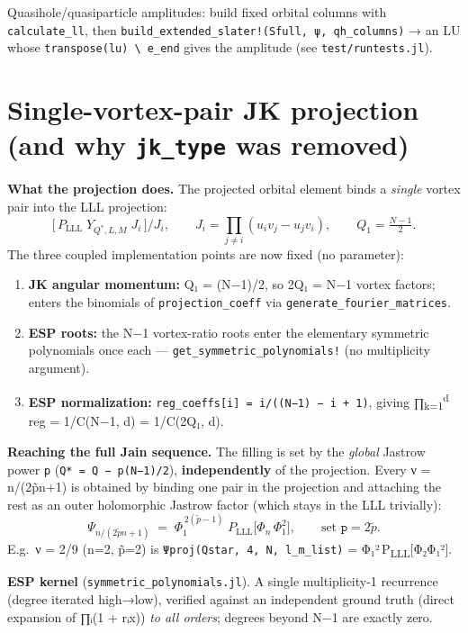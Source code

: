 \documentclass[11pt]{article}
\newcommand{\code}[1]{\texttt{#1}}
\begin{document}
Quasihole/quasiparticle amplitudes: build fixed orbital columns with \code{calculate\_ll}, then
\code{build\_extended\_slater!(Sfull, ψ, qh\_columns)} → an LU whose \code{transpose(lu) \textbackslash\ e\_end}
gives the amplitude (see \code{test/runtests.jl}).

\section{Single-vortex-pair JK projection (and why \code{jk\_type} was removed)}\label{sec:jktype}

\textbf{What the projection does.} The projected orbital element binds a \emph{single} vortex
pair into the LLL projection:
\[
\bigl[\,P_{\mathrm{LLL}}\; Y_{Q^*,L,M}\; J_i\,\bigr]\big/ J_i,
\qquad J_i = \prod_{j\neq i}(u_i v_j - u_j v_i),
\qquad Q_1 = \tfrac{N-1}{2}.
\]
The three coupled implementation points are now fixed (no parameter):
\begin{enumerate}
\item \textbf{JK angular momentum:} Q₁ = (N−1)/2, so 2Q₁ = N−1 vortex factors; enters the
  binomials of \code{projection\_coeff} via \code{generate\_fourier\_matrices}.
\item \textbf{ESP roots:} the N−1 vortex-ratio roots enter the elementary symmetric polynomials
  once each --- \code{get\_symmetric\_polynomials!} (no multiplicity argument).
\item \textbf{ESP normalization:} \code{reg\_coeffs[i] = i/((N−1) − i + 1)}, giving
  ∏\textsubscript{k=1}\textsuperscript{d} reg = 1/C(N−1, d) = 1/C(2Q₁, d).
\end{enumerate}

\textbf{Reaching the full Jain sequence.} The filling is set by the \emph{global} Jastrow power
\code{p} (\code{Q* = Q − p(N−1)/2}), \textbf{independently} of the projection. Every
ν = n/(2p̃n+1) is obtained by binding one pair in the projection and attaching the rest as an
outer holomorphic Jastrow factor (which stays in the LLL trivially):
\[
\Psi_{n/(2\tilde p n+1)} \;=\; \Phi_1^{\,2(\tilde p-1)}\; P_{\mathrm{LLL}}\!\bigl[\Phi_n\,\Phi_1^2\bigr],
\qquad\text{set } \code{p} = 2\tilde p .
\]
E.g.\ ν = 2/9 (n=2, p̃=2) is \code{Ψproj(Qstar, 4, N, l\_m\_list)} = Φ₁²\,P\textsubscript{LLL}[Φ₂Φ₁²].

\textbf{ESP kernel} (\code{symmetric\_polynomials.jl}). A single multiplicity-1 recurrence
(degree iterated high→low), verified against an independent ground truth (direct expansion of
∏ᵢ(1 + rᵢx)) \emph{to all orders}; degrees beyond N−1 are exactly zero.
\end{document}
